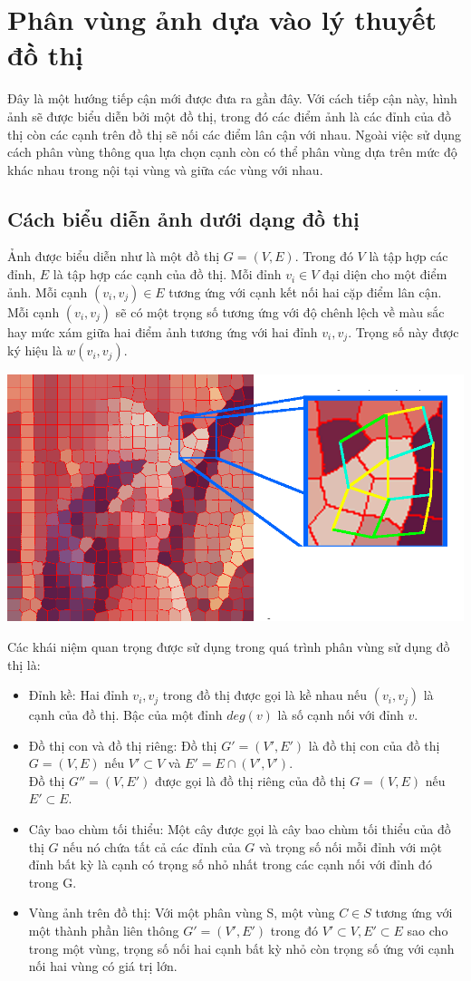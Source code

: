 \documentclass[12pt, oneside, a4paper]{book}
\begin{document}
\section{Phân vùng ảnh dựa vào lý thuyết đồ thị}
Đây là một hướng tiếp cận mới được đưa ra gần đây. Với cách tiếp cận này, hình ảnh sẽ được biểu diễn bởi một đồ thị, trong đó các điểm ảnh là các đỉnh của đồ thị còn các cạnh trên đồ thị sẽ nối các điểm lân cận với nhau. Ngoài việc sử dụng cách phân vùng thông qua lựa chọn cạnh còn có thể phân vùng dựa trên mức độ khác nhau trong nội tại vùng và giữa các vùng với nhau.
\subsection{Cách biểu diễn ảnh dưới dạng đồ thị}
Ảnh được biểu diễn như là một đồ thị $G=(V,E)$. Trong đó $V$ là tập hợp các đỉnh, $E$ là tập hợp các cạnh của đồ thị. Mỗi đỉnh $v_i\in V$ đại diện cho một điểm ảnh. Mỗi cạnh $(v_i,v_j)\in E$ tương ứng với cạnh kết nối hai cặp điểm lân cận. Mỗi cạnh $(v_i,v_j)$ sẽ có một trọng số tương ứng với độ chênh lệch về màu sắc hay mức xám giữa hai điểm ảnh tương ứng với hai đỉnh $v_i, v_j $. Trọng số này được ký hiệu là $w(v_i, v_j)$.
\begin{center}
\includegraphics[scale=0.3]{figure/graphbased.png}
\end{center}
Các khái niệm quan trọng được sử dụng trong quá trình phân vùng sử dụng đồ thị là:
\begin{itemize}
\item Đỉnh kề: Hai đỉnh $v_i, v_j$ trong đồ thị được gọi là kề nhau nếu $(v_i,v_j)$ là cạnh của đồ thị. Bậc của một đỉnh $deg(v)$ là số cạnh nối với đỉnh $v$.
\item Đồ thị con và đồ thị riêng:
Đồ thị $G'=(V',E')$ là đồ thị con của đồ thị $G=(V,E)$ nếu $V' \subset V$ và $E'=E\cap (V',V')$. \\
Đồ thị  $G''=(V,E')$ được gọi là đồ thị riêng của đồ thị $G=(V,E)$ nếu $E'\subset E$.
\item Cây bao chùm tối thiểu: Một cây được gọi là cây bao chùm tối thiểu của đồ thị $G$  nếu nó chứa tất cả các đỉnh của $G$ và trọng số nối mỗi đỉnh với một đỉnh bất kỳ là cạnh có trọng số nhỏ nhất trong các cạnh nối với đỉnh đó trong G. 
\item Vùng ảnh trên đồ thị: Với một phân vùng S, một vùng $C\in S$ tương ứng với một thành phần liên thông $G'=(V', E')$ trong đó  $V'\subset V, E' \subset E$ sao cho trong một vùng, trọng số nối hai cạnh bất kỳ nhỏ còn trọng số ứng với cạnh nối hai vùng có giá trị lớn.
\end{itemize}
\end{document}

